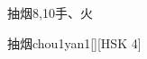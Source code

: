 \begin{entry}{抽烟}{8,10}{⼿、⽕}
  \begin{phonetics}{抽烟}{chou1yan1}[][HSK 4]
  \end{phonetics}
\end{entry}
